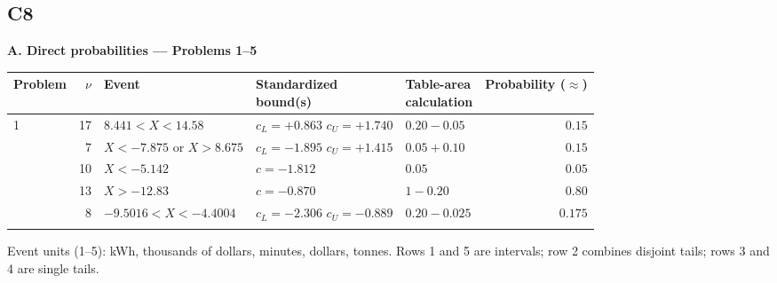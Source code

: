 \subsection*{C8}
\textbf{A. Direct probabilities --- Problems 1--5}
\par\smallskip
\begin{tabularx}{\linewidth}{@{}l r >{\raggedright\arraybackslash}X l l r@{}}
\toprule
Problem & $\nu$ & Event & \shortstack[l]{Standardized\\bound(s)} & \shortstack[l]{Table-area\\calculation} & \shortstack[r]{Probability\\($\approx$)} \\
\midrule
1 & 17 & $8.441<X<14.58$ & \shortstack[l]{$c_L=+0.863$\\$c_U=+1.740$} & $0.20-0.05$ & $\boldsymbol{0.15}$ \\
\addlinespace[2pt]
2 & 7 & \shortstack[l]{$X<-7.875$ or\\$X>8.675$} & \shortstack[l]{$c_L=-1.895$\\$c_U=+1.415$} & $0.05+0.10$ & $\boldsymbol{0.15}$ \\
\addlinespace[2pt]
3 & 10 & $X<-5.142$ & $c=-1.812$ & $0.05$ & $\boldsymbol{0.05}$ \\
\addlinespace[2pt]
4 & 13 & $X>-12.83$ & $c=-0.870$ & $1-0.20$ & $\boldsymbol{0.80}$ \\
\addlinespace[2pt]
5 & 8 & $-9.5016<X<-4.4004$ & \shortstack[l]{$c_L=-2.306$\\$c_U=-0.889$} & $0.20-0.025$ & $\boldsymbol{0.175}$ \\
\addlinespace[2pt]
\bottomrule
\end{tabularx}
\par\smallskip
Event units (1--5): kWh, thousands of dollars, minutes, dollars, tonnes.
Rows 1 and 5 are intervals; row 2 combines disjoint tails; rows 3 and 4 are single tails.

